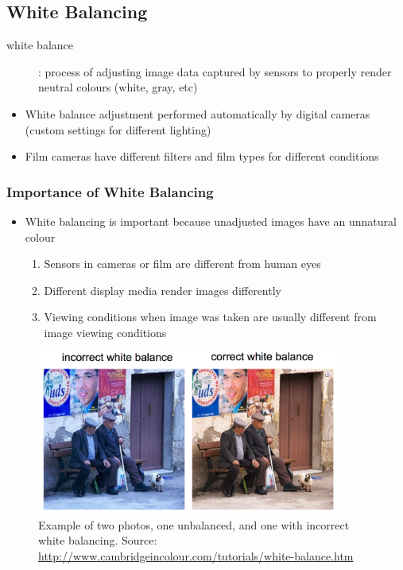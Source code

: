 \documentclass[letterpaper,12pt]{article}
\begin{document}
\subsection{White Balancing}
\begin{description}
 \item[white balance]: process of adjusting image data captured by sensors to properly render neutral colours (white, gray, etc)
\end{description}
\begin{itemize}
 \item White balance adjustment performed automatically by digital cameras (custom settings for different lighting)
 \item Film cameras have different filters and film types for different conditions
\end{itemize}

\subsubsection{Importance of White Balancing}
\begin{itemize}
 \item White balancing is important because unadjusted images have an unnatural colour
       \begin{enumerate}
        \item Sensors in cameras or film are different from human eyes
        \item Different display media render images differently
        \item Viewing conditions when image was taken are usually different from image viewing conditions
       \end{enumerate}
\end{itemize}

\begin{figure}[H]
 \centering
 \includegraphics[width=10cm]{images/wb.png}
 \caption{Example of two photos, one unbalanced, and one with incorrect white balancing.  Source: \url{http://www.cambridgeincolour.com/tutorials/white-balance.htm}}
\end{figure}
\end{document}
